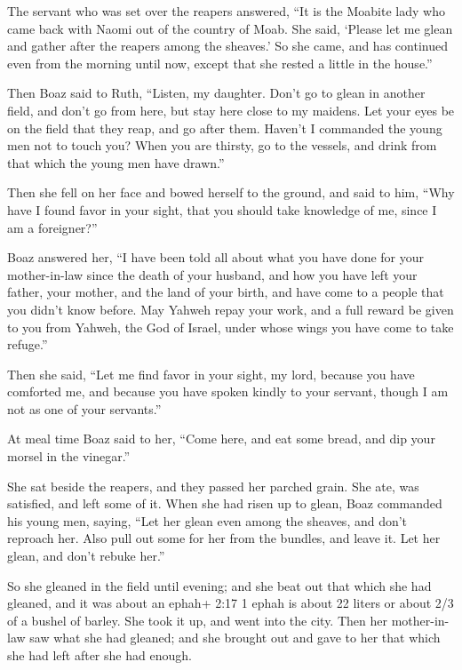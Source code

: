  The servant who was set over the reapers answered, ``It is
the Moabite lady who came back with Naomi out of the country of Moab.
 She said, `Please let me glean and gather after the reapers
among the sheaves.' So she came, and has continued even from the morning
until now, except that she rested a little in the house.''

 Then Boaz said to Ruth, ``Listen, my daughter. Don't go to
glean in another field, and don't go from here, but stay here close to
my maidens.  Let your eyes be on the field that they reap,
and go after them. Haven't I commanded the young men not to touch you?
When you are thirsty, go to the vessels, and drink from that which the
young men have drawn.''

 Then she fell on her face and bowed herself to the ground,
and said to him, ``Why have I found favor in your sight, that you should
take knowledge of me, since I am a foreigner?''

 Boaz answered her, ``I have been told all about what you
have done for your mother-in-law since the death of your husband, and
how you have left your father, your mother, and the land of your birth,
and have come to a people that you didn't know before.  May
Yahweh repay your work, and a full reward be given to you from Yahweh,
the God of Israel, under whose wings you have come to take refuge.''

 Then she said, ``Let me find favor in your sight, my lord,
because you have comforted me, and because you have spoken kindly to
your servant, though I am not as one of your servants.''

 At meal time Boaz said to her, ``Come here, and eat some
bread, and dip your morsel in the vinegar.''

She sat beside the reapers, and they passed her parched grain. She ate,
was satisfied, and left some of it.  When she had risen up
to glean, Boaz commanded his young men, saying, ``Let her glean even
among the sheaves, and don't reproach her.  Also pull out
some for her from the bundles, and leave it. Let her glean, and don't
rebuke her.''

 So she gleaned in the field until evening; and she beat
out that which she had gleaned, and it was about an ephah+ 2:17 1 ephah
is about 22 liters or about 2/3 of a bushel of barley.  She
took it up, and went into the city. Then her mother-in-law saw what she
had gleaned; and she brought out and gave to her that which she had left
after she had enough.


